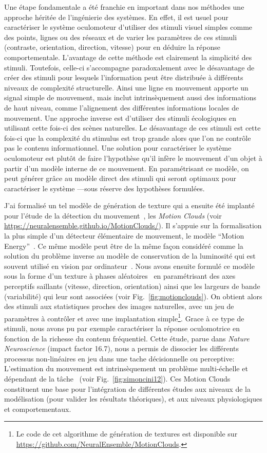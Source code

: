 Une étape fondamentale a été franchie en important dans nos méthodes une approche héritée de l'ingénierie des systèmes. En effet, il est usuel pour caractériser le système oculomoteur d'utiliser des stimuli visuel simples comme des points, lignes ou des réseaux et de varier les paramètres de ces stimuli (contraste, orientation, direction, vitesse) pour en déduire la réponse comportementale. L'avantage de cette méthode est clairement la simplicité des stimuli. Toutefois, celle-ci s'accompagne paradoxalement avec le désavantage de créer des stimuli pour lesquels l'information peut être distribuée à différents niveaux de complexité structurelle. Ainsi une ligne en mouvement apporte un signal simple de mouvement, mais inclut intrinsèquement aussi des informations de haut niveau, comme l'alignement des différentes informations locales de mouvement. Une approche inverse est d'utiliser des stimuli écologiques en utilisant cette fois-ci des scènes naturelles. Le désavantage de ces stimuli est cette fois-ci que la complexité du stimulus est trop grande alors que l'on ne contrôle pas le contenu informationnel. Une solution pour caractériser le système oculomoteur est plutôt de faire l'hypothèse qu'il infère le mouvement d'un objet à partir d'un modèle interne de ce mouvement. En paramétrisant ce modèle, on peut générer grâce au modèle direct des stimuli qui seront optimaux pour caractériser le système ---sous réserve des hypothèses formulées. %

J'ai formalisé un tel modèle de génération de texture qui a ensuite été implanté pour l'étude de la détection du mouvement~\citep{Sanz12}, les \emph{Motion Clouds} (voir \url{https://neuralensemble.github.io/MotionClouds/}). Il s'appuie sur la formalisation la plus simple d'un détecteur élémentaire de mouvement, le modèle ``Motion Energy''~\citep{Adelson85}. Ce même modèle peut être de la même façon considéré comme la solution du problème inverse au modèle de conservation de la luminosité qui est souvent utilisé en vision par ordinateur~\citep{Aubert00}. Nous avons ensuite formulé ce modèle sous la forme d'un texture à phases aléatoires~\citep{Galerne10} en paramétrisant des axes perceptifs saillants (vitesse, direction, orientation) ainsi que les largeurs de bande (variabilité) qui leur sont associées (voir Fig.~\ref{fig:motionclouds}). On obtient alors des stimuli aux statistiques proches des images naturelles, avec un jeu de paramètres à contrôler et avec une implantation simple\footnote{Le code de cet algorithme de génération de textures est disponible sur \url{https://github.com/NeuralEnsemble/MotionClouds}.}. Grace à ce type de stimuli, nous avons pu par exemple caractériser la réponse oculomotrice en fonction de la richesse du contenu fréquentiel. Cette étude, parue dans \emph{Nature Neuroscience} (impact factor 16.7), nous a permis de dissocier les différents processus non-linéaires en jeu dans une tache décisionnelle ou perceptive: L'estimation du mouvement est intrinsèquement un problème multi-échelle et dépendant de la tâche~\citep{Simoncini12} (voir Fig.~\ref{fig:simoncini12}). Ces Motion Clouds constituent une base pour l'intégration de différentes études aux niveaux de la modélisation (pour valider les résultats théoriques), et aux niveaux physiologiques et comportementaux. %

